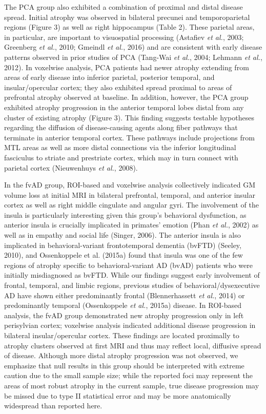 \documentclass[]{article}
\begin{document}
The PCA group also exhibited a combination of proximal and distal
disease spread. Initial atrophy was observed in bilateral precunei and
temporoparietal regions (Figure 3) as well as right hippocampus (Table
2). These parietal areas, in particular, are important to visuospatial
processing (Astafiev \emph{et al.}, 2003; Greenberg \emph{et al.}, 2010;
Gmeindl \emph{et al.}, 2016) and are consistent with early disease
patterns observed in prior studies of PCA (Tang-Wai \emph{et al.}, 2004;
Lehmann \emph{et al.}, 2012). In voxelwise analysis, PCA patients had
newer atrophy extending from areas of early disease into inferior
parietal, posterior temporal, and insular/opercular cortex; they also
exhibited spread proximal to areas of prefrontal atrophy observed at
baseline. In addition, however, the PCA group exhibited atrophy
progression in the anterior temporal lobes distal from any cluster of
existing atrophy (Figure 3). This finding suggests testable hypotheses
regarding the diffusion of disease-causing agents along fiber pathways
that terminate in anterior temporal cortex. These pathways include
projections from MTL areas as well as more distal connections via the
inferior longitudinal fasciculus to striate and prestriate cortex, which
may in turn connect with parietal cortex (Nieuwenhuys \emph{et al.},
2008).

In the fvAD group, ROI-based and voxelwise analysis collectively
indicated GM volume loss at initial MRI in bilateral prefrontal,
temporal, and anterior insular cortex as well as right middle cingulate
and angular gyri. The involvement of the insula is particularly
interesting given this group's behavioral dysfunction, as anterior
insula is crucially implicated in primates' emotion (Phan \emph{et al.},
2002) as well as in empathy and social life (Singer, 2006). The anterior
insula is also implicated in behavioral-variant frontotemporal dementia
(bvFTD) (Seeley, 2010), and Ossenkoppele et al. (2015a) found that
insula was one of the few regions of atrophy specific to
behavioral-variant AD (bvAD) patients who were initially misdiagnosed as
bvFTD. While our findings suggest early involvement of frontal,
temporal, and limbic regions, previous studies of
behavioral/dysexecutive AD have shown either predominantly frontal
(Blennerhassett \emph{et al.}, 2014) or predominantly temporal
(Ossenkoppele \emph{et al.}, 2015a) disease. In ROI-based analysis, the
fvAD group demonstrated new atrophy progression only in left perisylvian
cortex; voxelwise analysis indicated additional disease progression in
bilateral insular/opercular cortex. These findings are located
proximally to atrophy clusters observed at first MRI and thus may
reflect local, diffusive spread of disease. Although more distal atrophy
progression was not observed, we emphasize that null results in this
group should be interpreted with extreme caution due to the small sample
size; while the reported foci may represent the areas of most robust
atrophy in the current sample, true disease progression may be missed
due to type II statistical error and may be more anatomically widespread
than reported here.
\end{document}
